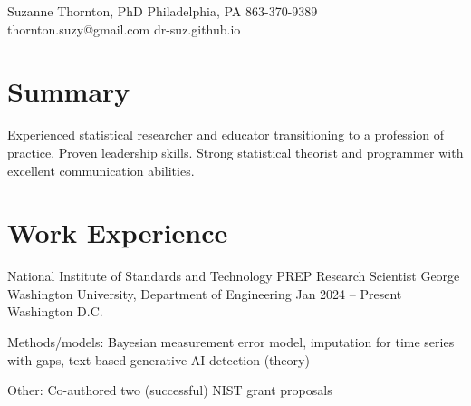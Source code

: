 \documentclass[letterpaper]{resume_config}
\begin{document}
\Header
    {Suzanne Thornton, PhD}  
    {Philadelphia, PA} 
    {863-370-9389}  
    {thornton.suzy@gmail.com} 
    {dr-suz.github.io} \

\section{Summary}
Experienced statistical researcher and educator transitioning to a profession of practice. Proven leadership skills. Strong statistical theorist and programmer with excellent communication abilities. %


\section{Work Experience}
\WorkExperience
    {National Institute of Standards and Technology PREP Research Scientist}  
    {George Washington University, Department of Engineering}  
    {Jan 2024 -- Present}  
    {Washington D.C.}  
    {
        \item Methods/models: Bayesian measurement error model, imputation for time series with gaps, text-based generative AI detection (theory)
        \item Other: Co-authored two (successful) NIST grant proposals 
    } 
    
\end{document}
